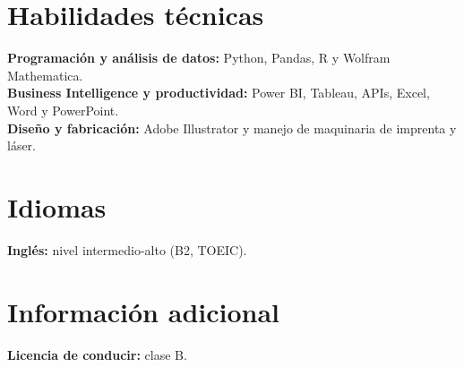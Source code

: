 \documentclass[11pt,a4paper]{article}
\begin{document}
\section{Habilidades técnicas}
\textbf{Programación y análisis de datos:} Python, Pandas, R y Wolfram Mathematica.\\
\textbf{Business Intelligence y productividad:} Power BI, Tableau, APIs, Excel, Word y PowerPoint.\\
\textbf{Diseño y fabricación:} Adobe Illustrator y manejo de maquinaria de imprenta y láser.

\section{Idiomas}
\textbf{Inglés:} nivel intermedio-alto (B2, TOEIC).

\section{Información adicional}
\textbf{Licencia de conducir:} clase B.
\end{document}

